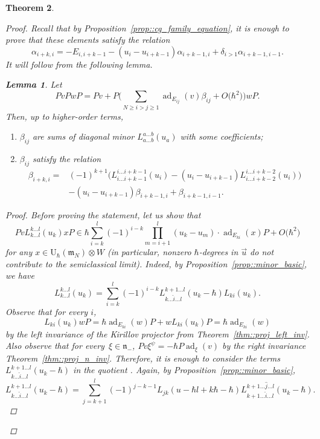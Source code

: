 \documentclass[pdftex]{sigma}
\numberwithin{equation}{section}
\newtheorem{Theorem}{Theorem}[section]
\newtheorem{Lemma}[Theorem]{Lemma}
\newcommand{\U}{\mathrm{U}_{\hbar}}
\newcommand{\n}{\mathfrak{n}}
\newcommand{\m}{\mathfrak{m}}
\DeclareMathOperator{\ad}{ad}
\begin{document}
\begin{Theorem}
\begin{proof}
			Recall that by Proposition~\ref{prop::cg_family_equation}, it is enough to prove that these elements satisfy the relation
			\[
			\alpha_{i+k,i} = -E_{i,i+k-1} - (u_i-u_{i+k-1}) \alpha_{i+k-1,i} + \delta_{i > 1} \alpha_{i+k-1,i-1}.
			\]
			It will follow from the following lemma.
			\begin{Lemma}
				Let
				\[
				PvPwP = Pv + P\biggl( \sum\limits_{N \geq i > j \geq 1} \ad_{E_{ij}}(v) \beta_{ij} + O\bigl(\hbar^2\bigr)\biggr)wP.
				\]
				Then, up to higher-order terms,
				\begin{enumerate}\itemsep=0pt
					\item[$(1)$] $\beta_{ij}$ are sums of diagonal minor $L_{a\dots b}^{a\dots b}(u_a)$ with some coefficients;
					\item[$(2)$] $\beta_{ij}$ satisfy the relation
					\begin{align}
							\beta_{i+k,i} ={}& (-1)^{k+1}\bigl(L_{i\dots i+k-1}^{i\dots i+k-1}(u_i) - (u_i - u_{i+k-1}) L_{i \dots i+k-2}^{i \dots i+k-2}(u_i)\bigr)\nonumber \\
							&-(u_i - u_{i+k-1}) \beta_{i+k-1,i} + \beta_{i+k-1,i-1}.\label{eq::beta_relation}
					\end{align}
				\end{enumerate}
				\begin{proof}
					Before proving the statement, let us show that
					\[
					Pv L_{k\dots l}^{k \dots l}(u_k) x P \in \hbar \sum\limits_{i=k}^l (-1)^{i-k} \prod_{m=i+1}^l (u_k - u_m) \cdot \ad_{E_{ki}}(x) P + O\bigl(\hbar^2\bigr)
					\]
					for any $x\in \U(\m_N) \otimes W$ (in particular, nonzero $\hbar$-degrees in $\vec{u}$ do not contribute to the semiclassical limit). Indeed, by Proposition~\ref{prop::minor_basic}, we have
					\[
					L_{k \dots l}^{k \dots l}(u_k) = \sum\limits_{i=k}^l (-1)^{i-k} L_{k \dots \hat{i} \dots l}^{k+1 \dots l}(u_k-\hbar) L_{ki}(u_k).
					\]
					Observe that for every $i$,
					\[
					L_{ki}(u_k) wP = \hbar \ad_{E_{ki}}(w) P + wL_{ki}(u_k)P = \hbar \ad_{E_{ki}}(w)
					\]
					by the left invariance of the Kirillov projector from Theorem~\ref{thm::proj_left_inv}. Also observe that for every~${\xi \in \n_-}$,
					$
					Pv \xi^{\psi} = - \hbar P \ad_{\xi}(v)
					$
					by the right invariance Theorem~\ref{thm::proj_n_inv}. Therefore, it is enough to consider the terms $L_{k \dots \hat{i} \dots l}^{k+1 \dots l}(u_k-\hbar)$ in the quotient \smash{$\n_-^{\psi} \backslash \U(\m_N)$}. Again, by Proposition~\ref{prop::minor_basic},
					\[
					L_{k \dots \hat{i} \dots l}^{k+1 \dots l}(u_k-\hbar) = \sum\limits_{j=k+1}^l (-1)^{j-k-1} L_{jk}(u-\hbar l + k \hbar - \hbar) L_{k+1\dots \hat{i} \dots l}^{k+1\dots \hat{j} \dots l}(u_k - \hbar).
\]
\end{proof}
\end{Lemma}
\end{proof}
\end{Theorem}
\end{document}
